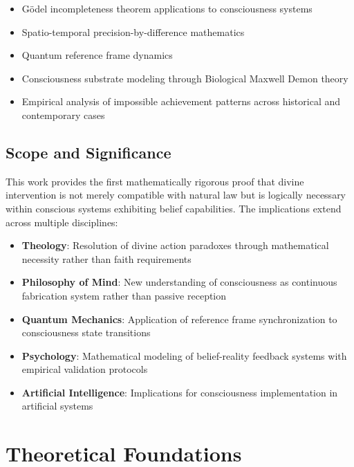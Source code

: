 \documentclass[12pt,a4paper]{article}
\begin{document}
\begin{itemize}
\item Gödel incompleteness theorem applications to consciousness systems \citep{godel1931formally, hofstadter1979godel}
\item Spatio-temporal precision-by-difference mathematics \citep{sachikonye2024temporal, sachikonye2024network}
\item Quantum reference frame dynamics \citep{rovelli2004quantum, wheeler1989information}
\item Consciousness substrate modeling through Biological Maxwell Demon theory \citep{sachikonye2024bmd, sachikonye2024consciousness}
\item Empirical analysis of impossible achievement patterns across historical and contemporary cases
\end{itemize}

\subsection{Scope and Significance}

This work provides the first mathematically rigorous proof that divine intervention is not merely compatible with natural law but is logically necessary within conscious systems exhibiting belief capabilities. The implications extend across multiple disciplines:

\begin{itemize}
\item \textbf{Theology}: Resolution of divine action paradoxes through mathematical necessity rather than faith requirements
\item \textbf{Philosophy of Mind}: New understanding of consciousness as continuous fabrication system rather than passive reception
\item \textbf{Quantum Mechanics}: Application of reference frame synchronization to consciousness state transitions
\item \textbf{Psychology}: Mathematical modeling of belief-reality feedback systems with empirical validation protocols
\item \textbf{Artificial Intelligence}: Implications for consciousness implementation in artificial systems
\end{itemize}

\section{Theoretical Foundations}
\end{document}
